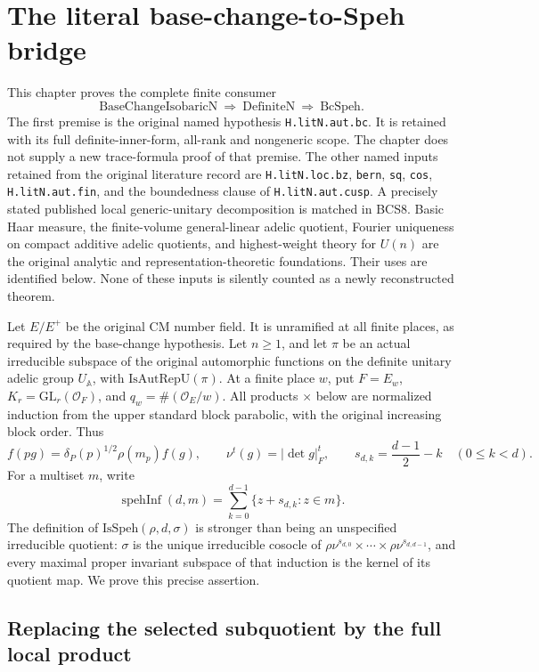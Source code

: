 \section{The literal base-change-to-Speh bridge}
\label{sec:base-change-v44}

This chapter proves the complete finite consumer
\[
 \mathrm{BaseChangeIsobaricN}\ \Longrightarrow\
 \mathrm{DefiniteN}\ \Longrightarrow\ \mathrm{BcSpeh}.
 \tag{BCS.1}
\]
The first premise is the original named hypothesis
\texttt{H.litN.aut.bc}.  It is retained with its full definite-inner-form,
all-rank and nongeneric scope.  The chapter does not supply a new
trace-formula proof of that premise.  The other named inputs retained
from the original literature record are
\texttt{H.litN.loc.bz}, \texttt{bern}, \texttt{sq}, \texttt{cos},
\texttt{H.litN.aut.fin}, and the boundedness clause of
\texttt{H.litN.aut.cusp}.  A precisely stated published local
generic-unitary decomposition is matched in BCS8.  Basic Haar measure,
the finite-volume general-linear adelic quotient, Fourier uniqueness on
compact additive adelic quotients, and highest-weight theory for
\(U(n)\) are the original analytic and representation-theoretic
foundations.  Their uses are identified below.  None of these inputs
is silently counted as a newly reconstructed theorem.

Let \(E/E^+\) be the original CM number field.  It is unramified at
all finite places, as required by the base-change hypothesis.
Let \(n\ge1\), and
let \(\pi\) be an actual irreducible subspace of the original
automorphic functions on the definite unitary adelic group
\(U_{\mathbb A}\), with \(\mathrm{IsAutRepU}(\pi)\).
At a finite place \(w\), put \(F=E_w\),
\(K_r=\mathrm{GL}_r(\mathcal O_F)\), and
\(q_w=\#(\mathcal O_E/w)\).  All products \(\times\) below are
normalized induction from the upper standard block parabolic, with
the original increasing block order.  Thus
\[
 f(pg)=\delta_P(p)^{1/2}\rho(m_p)f(g),\qquad
 \nu^t(g)=|\det g|_F^t,\qquad
 s_{d,k}=\frac{d-1}{2}-k\quad(0\le k<d).
 \tag{BCS.2}
\]
For a multiset \(m\), write
\[
 \operatorname{spehInf}(d,m)
   =\sum_{k=0}^{d-1}\{z+s_{d,k}:z\in m\}.
 \tag{BCS.3}
\]
The definition of \(\mathrm{IsSpeh}(\rho,d,\sigma)\) is stronger
than being an unspecified irreducible quotient: \(\sigma\) is the
unique irreducible cosocle of
\(\rho\nu^{s_{d,0}}\times\cdots\times\rho\nu^{s_{d,d-1}}\),
and every maximal proper invariant subspace of that induction is the
kernel of its quotient map.  We prove this precise assertion.

\subsection{Replacing the selected subquotient by the full local product}

